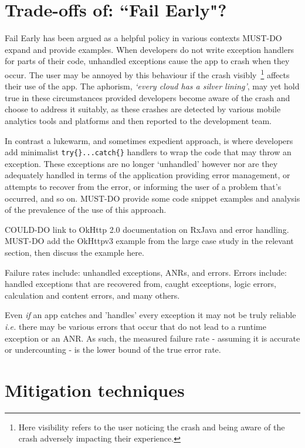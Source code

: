\section{Trade-offs of: ``Fail Early"?}
Fail Early has been argued as a helpful policy in various contexts MUST-DO expand and provide examples. When developers do not write exception handlers for parts of their code, unhandled exceptions cause the app to crash when they occur. The user may be annoyed by this behaviour if the crash visibly~\footnote{Here visibility refers to the user noticing the crash and being aware of the crash adversely impacting their experience.}  affects their use of the app. The aphorism, \emph{`every cloud has a silver lining'}, may yet hold true in these circumstances provided developers become aware of the crash and choose to address it suitably, as these crashes are detected by various mobile analytics tools and platforms and then reported to the development team.

In contrast a lukewarm, and sometimes expedient approach, is where developers add minimalist \texttt{try\{\}...catch\{\}} handlers to wrap the code that may throw an exception. These exceptions are no longer `unhandled' however nor are they adequately handled in terms of the application providing error management, or attempts to recover from the error, or informing the user of a problem that's occurred, and so on. MUST-DO provide some code snippet examples and analysis of the prevalence of the use of this approach.

COULD-DO link to OkHttp 2.0 documentation on RxJava and error handling. MUST-DO add the OkHttpv3 example from the large case study in the relevant section, then discuss the example here.

Failure rates include: unhandled exceptions, ANRs, and errors. Errors include: handled exceptions that are recovered from, caught exceptions, logic errors, calculation and content errors, and many others. 

Even \textit{if} an app catches and 'handles' every exception it may not be truly reliable \textit{i.e.} there may be various errors that occur that do not lead to a runtime exception or an ANR. As such, the measured failure rate - assuming it is accurate or undercounting - is the lower bound of the true error rate.

\section{Mitigation techniques}

